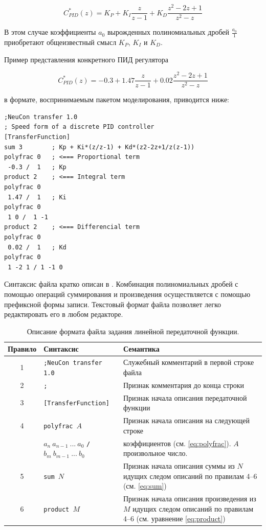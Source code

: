 \begin{equation}\label{eq:pid}
C_{PID}^*(z)=K_P+K_I\frac{z}{z-1}+K_D\frac{z^2-2z+1}{z^2-z}
\end{equation}

В этом случае коэффициенты $a_0$ вырожденных полиномиальных дробей
$\frac{a_0}{1}$ приобретают общеизвестный смысл $K_P$, $K_I$ и $K_D$.

Пример представления конкретного ПИД регулятора

\begin{equation}\label{eq:pid_example}
C_{PID}^*(z)=-0.3+1.47\frac{z}{z-1}+0.02\frac{z^2-2z+1}{z^2-z}
\end{equation}

\noindent в формате, воспринимаемым пакетом моделирования, приводится ниже:

\begin{verbatim}
;NeuCon transfer 1.0
; Speed form of a discrete PID controller
[TransferFunction]
sum 3		 ; Kp + Ki*(z/z-1) + Kd*(z2-2z+1/z(z-1))
polyfrac 0	 ; <=== Proportional term
 -0.3 /  1	 ; Kp
product 2	 ; <=== Integral term
polyfrac 0
 1.47 /  1	 ; Ki
polyfrac 0
 1 0 /  1 -1
product 2	 ; <=== Differencial term
polyfrac 0
 0.02 /  1	 ; Kd
polyfrac 0
 1 -2 1 / 1 -1 0
\end{verbatim}

Синтаксис файла кратко описан в .  Комбинация
полиномиальных дробей с помощью операций суммирования и произведения
осуществляется с помощью префиксной формы записи.  Текстовый формат
файла позволяет легко редактировать его в любом редакторе.

\begin{table}[ht]
\centering
\caption{Описание формата файла задания линейной передаточной функции.}
\label{tabl:tf_syntax}
\begin{tabular}{|c|l|p{9.5cm}|}
\hline
Правило & Синтаксис & Семантика \\
\hline
1 & \tt ;NeuCon transfer 1.0 & Служебный комментарий в первой строке файла \\
2 & \tt ;                    & Признак комментария до конца строки \\
3 & \tt [TransferFunction]   & Признак начала описания передаточной функции \\
4 & \tt polyfrac $A$           & Признак начала описания на следующей строке \\
  & $a_n\:a_{n-1}\:...\:a_0$ {\tt /} $b_m\:b_{m-1}\:...\:b_0$ & коэффициентов (см. \ref{eq:polyfrac}).  $A$ произвольное число. \\
5 & \tt sum $N$              & Признак начала описания суммы из $N$ идущих следом описаний по правилам 4--6 (см. \ref{eq:sum}) \\
6 & \tt product $M$          & Признак начала описания произведения из $M$ идущих следом описаний по правилам 4--6 (см. уравнение \ref{eq:product}) \\
\hline
\end{tabular}
\end{table}

